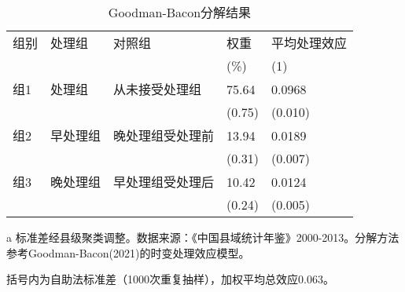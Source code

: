 
\begin{table}[htbp]
\footnotesize
\centering
\caption{Goodman-Bacon分解结果}\label{tab:goodmanbacon}
\begin{threeparttable}
\begin{tabular}{l l l R R}
\toprule
组别 & 处理组 & 对照组 & 权重 & 平均处理效应 \\
& & & (\%) & (1) \\ 
\midrule
组1 & 处理组 & 从未接受处理组 & 75.64 & 0.0968 \\
& & & (0.75) & (0.010) \\
\addlinespace[0.5ex]
组2 & 早处理组 & 晚处理组受处理前 & 13.94 & 0.0189 \\
& & & (0.31) & (0.007) \\
\addlinespace[0.5ex]
组3 & 晚处理组 & 早处理组受处理后 & 10.42 & 0.0124 \\
& & & (0.24) & (0.005) \\
\bottomrule
\end{tabular}

\begin{tablenotes}
\scriptsize
\item[a] 标准差经县级聚类调整。数据来源：《中国县域统计年鉴》2000-2013。分解方法参考Goodman-Bacon(2021)的时变处理效应模型。
\item 括号内为自助法标准差（1000次重复抽样），加权平均总效应0.063。
\end{tablenotes}
\end{threeparttable}
\end{table}





